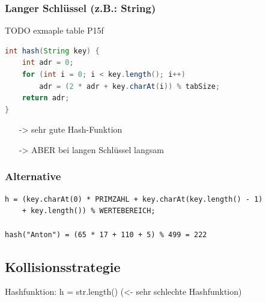 \documentclass{article}
\newcommand\Tstrut{\rule{0pt}{2.6ex}}         %
\begin{document}
\subsubsection{Langer Schlüssel (z.B.: String)}

TODO exmaple table P15f

\begin{lstlisting}[language=Java, tabsize=4]
int hash(String key) {
    int adr = 0;
    for (int i = 0; i < key.length(); i++)
        adr = (2 * adr + key.charAt(i)) % tabSize;
    return adr;
}
\end{lstlisting}

\begin{itemize}
  \item[->] sehr gute Hash-Funktion
  \item[->] ABER bei langen Schlüssel langsam
\end{itemize}

\subsubsection{Alternative}

\begin{lstlisting}[tabsize=4]
h = (key.charAt(0) * PRIMZAHL + key.charAt(key.length() - 1)
    + key.length()) % WERTEBEREICH;

hash("Anton") = (65 * 17 + 110 + 5) % 499 = 222
\end{lstlisting}

\subsection{Kollisionsstrategie}

Hashfunktion: h = str.length() \hspace{6pt} (<- sehr schlechte Hashfunktion) \Tstrut
\end{document}
